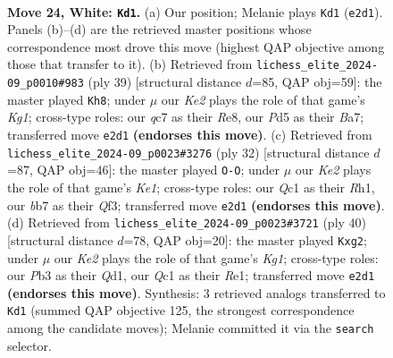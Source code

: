 \documentclass[11pt]{article}
\begin{document}
\begin{figure}[p]
\label{fig:thought-m44}
\end{figure}

\clearpage

\begin{figure}[p]\centering
\begin{subfigure}{0.46\textwidth}\centering
\resizebox{\linewidth}{!}{%
\newchessgame
\chessboard[
  setfen={2r3k1/1bqn1p1p/5rp1/pp1Pp3/4P3/1PP3P1/4KP1P/R1Q3NR w - - 0 24},
  showmover=false,
  pgfstyle=straightmove, color=movearrow, markmove={e2-d1}
]}
\caption{}
\end{subfigure}\hfill
\begin{subfigure}{0.46\textwidth}\centering
\resizebox{\linewidth}{!}{%
\newchessgame
\chessboard[
  setfen={r2qr1k1/b1p2pp1/p1p4p/4P3/2PpN3/6QP/PP3PP1/3RR1K1 b - - 1 20},
  showmover=false,
  pgfstyle=straightmove, color=movearrow, markmove={g8-h8}
]}
\caption{}
\end{subfigure}
\\[4pt]
\begin{subfigure}{0.46\textwidth}\centering
\resizebox{\linewidth}{!}{%
\newchessgame
\chessboard[
  setfen={2kr3r/pppq2p1/2n3p1/4pp2/8/3PPQNP/PPP3P1/R3K2R w KQ - 0 17},
  showmover=false,
  pgfstyle=straightmove, color=movearrow, markmove={e1-g1}
]}
\caption{}
\end{subfigure}\hfill
\begin{subfigure}{0.46\textwidth}\centering
\resizebox{\linewidth}{!}{%
\newchessgame
\chessboard[
  setfen={1r3rk1/p1p1q1pp/1p6/2p1Pp2/2P2P2/P1PP4/6bP/1R1QR1K1 w - - 0 21},
  showmover=false,
  pgfstyle=straightmove, color=movearrow, markmove={g1-g2}
]}
\caption{}
\end{subfigure}
\caption{\textbf{Move 24, White: \texttt{Kd1}.} (a) Our position; Melanie plays \texttt{Kd1} (\texttt{e2d1}). Panels (b)--(d) are the retrieved master positions whose correspondence most drove this move (highest QAP objective among those that transfer to it). (b) Retrieved from \texttt{lichess\_elite\_2024-09\_p0010\#983} (ply 39) [structural distance $d$=85, QAP obj=59]: the master played \texttt{Kh8}; under $\mu$ our \emph{Ke2} plays the role of that game's \emph{Kg1}; cross-type roles: our \emph{q}c7 as their \emph{R}e8, our \emph{P}d5 as their \emph{B}a7; transferred move \texttt{e2d1} \textbf{(endorses this move)}. (c) Retrieved from \texttt{lichess\_elite\_2024-09\_p0023\#3276} (ply 32) [structural distance $d$=87, QAP obj=46]: the master played \texttt{O-O}; under $\mu$ our \emph{Ke2} plays the role of that game's \emph{Ke1}; cross-type roles: our \emph{Q}c1 as their \emph{R}h1, our \emph{b}b7 as their \emph{Q}f3; transferred move \texttt{e2d1} \textbf{(endorses this move)}. (d) Retrieved from \texttt{lichess\_elite\_2024-09\_p0023\#3721} (ply 40) [structural distance $d$=78, QAP obj=20]: the master played \texttt{Kxg2}; under $\mu$ our \emph{Ke2} plays the role of that game's \emph{Kg1}; cross-type roles: our \emph{P}b3 as their \emph{Q}d1, our \emph{Q}c1 as their \emph{R}e1; transferred move \texttt{e2d1} \textbf{(endorses this move)}. Synthesis: 3 retrieved analogs transferred to \texttt{Kd1} (summed QAP objective 125, the strongest correspondence among the candidate moves); Melanie committed it via the \texttt{search} selector.}

\end{figure}
\end{document}

